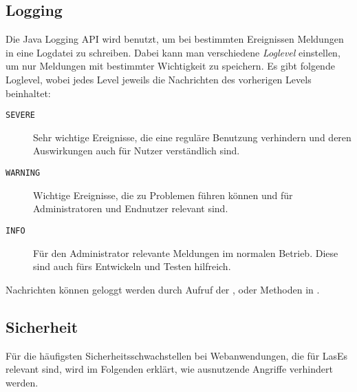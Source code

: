 
\subsection{Logging}\label{subsec:logging}
Die Java Logging API wird benutzt, um bei bestimmten Ereignissen Meldungen in eine Logdatei zu schreiben.
Dabei kann man verschiedene \emph{Loglevel} einstellen, um nur Meldungen mit bestimmter Wichtigkeit zu speichern.
Es gibt folgende Loglevel, wobei jedes Level jeweils die Nachrichten des vorherigen Levels beinhaltet:
\begin{description}
    \item[\texttt{SEVERE}] Sehr wichtige Ereignisse, die eine reguläre Benutzung verhindern und deren Auswirkungen auch für Nutzer verständlich sind.
    \item[\texttt{WARNING}] Wichtige Ereignisse, die zu Problemen führen können und für Administratoren und Endnutzer relevant sind.
    \item[\texttt{INFO}] Für den Administrator relevante Meldungen im normalen Betrieb. Diese sind auch fürs Entwickeln und Testen hilfreich.
\end{description}
Nachrichten können geloggt werden durch Aufruf der ,  oder  Methoden in .

\subsection{Sicherheit}\label{subsec:sicherheit}
Für die häufigsten Sicherheitsschwachstellen bei Webanwendungen, die für LasEs relevant sind, wird im Folgenden erklärt, wie ausnutzende Angriffe verhindert werden.


